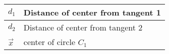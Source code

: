 \begin{tabular}{|l|l|}
\hline
    $d_1$ & Distance of center from tangent 1 \\
    \hline
    $d_2$ & Distance of center from tangent 2\\
    \hline
    $\Vec{x}$ & center of circle $C_1$ \\
    \hline
\end{tabular}